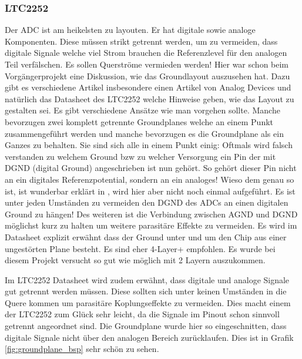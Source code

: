 \subsubsection*{LTC2252}
Der ADC ist am heikelsten zu layouten. Er hat digitale sowie analoge Komponenten. Diese müssen strikt getrennt werden, um zu vermeiden, dass digitale Signale welche viel Strom brauchen die Referenzlevel für den analogen Teil verfälschen. Es sollen Querströme vermieden werden!
Hier war schon beim Vorgängerprojekt eine Diskussion, wie das Groundlayout auszusehen hat. Dazu gibt es verschiedene Artikel insbesondere einen Artikel von Analog Devices \cite{StayingWellGrounded2012} und natürlich das Datasheet des LTC2252\cite{LTC2252} welche Hinweise geben, wie das Layout zu gestalten sei. Es gibt verschiedene Ansätze wie man vorgehen sollte. Manche bevorzugen zwei komplett getrennte Groundplanes welche an einem Punkt zusammengeführt werden und manche bevorzugen es die Groundplane als ein Ganzes zu behalten. Sie sind sich alle in einem Punkt einig: Oftmals wird falsch verstanden zu welchem Ground bzw zu welcher Versorgung ein Pin der mit DGND (digital Ground) angeschrieben ist nun gehört. So gehört dieser Pin nicht an ein digitales Referenzpotential, sondern an ein analoges! Wieso dem genau so ist, ist wunderbar erklärt in \cite{StayingWellGrounded2012}, wird hier aber nicht noch einmal aufgeführt.
Es ist unter jeden Umständen zu vermeiden den DGND des ADCs an einen digitalen Ground zu hängen! Des weiteren ist die Verbindung zwischen AGND und DGND möglichst kurz zu halten um weitere parasitäre Effekte zu vermeiden.
Es wird im Datasheet explizit erwähnt dass der Ground unter und um den Chip aus einer ungestörten Plane besteht. Es sind eher 4-Layer+ empfohlen. Es wurde bei diesem Projekt versucht so gut wie möglich mit 2 Layern auszukommen.

Im LTC2252 Datasheet wird zudem erwähnt, dass digitale und analoge Signale gut getrennt werden müssen. Diese sollten sich unter keinen Umständen in die Quere kommen um parasitäre Koplungseffekte zu vermeiden. Dies macht einem der LTC2252 zum Glück sehr leicht, da die Signale im Pinout schon sinnvoll getrennt angeordnet sind.
Die Groundplane wurde hier so eingeschnitten, dass digitale Signale nicht über den analogen Bereich zurücklaufen. Dies ist in Grafik \ref{fig:groundplane_bsp} sehr schön zu sehen.

